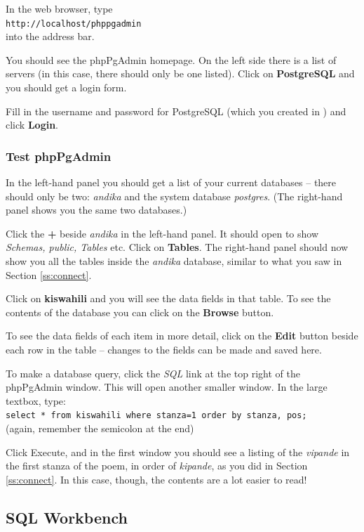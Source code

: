 In the web browser, type\\
\verb|http://localhost/phppgadmin|\\
into the address bar.

You should see the phpPgAdmin homepage. On the left side there is a list of servers (in this case, there should only be one listed). Click on \textbf{PostgreSQL} and you should get a login form.

Fill in the username and password for PostgreSQL (which you created in ) and click \textbf{Login}.

\subsubsection{Test phpPgAdmin}
\label{ss:testppa}

In the left-hand panel you should get a list of your current databases -- there should only be two: \textit{andika} and the system database \textit{postgres}. (The right-hand panel shows you the same two databases.)

Click the \textbf{+} beside \textit{andika} in the left-hand panel.  It should open to show \textit{Schemas, public, Tables} etc. Click on \textbf{Tables}. The right-hand panel should now show you all the tables inside the \textit{andika} database, similar to what you saw in Section \ref{ss:connect}.

Click on \textbf{kiswahili} and you will see the data fields in that table. To see the contents of the database you can click on the \textbf{Browse} button.

To see the data fields of each item in more detail, click on the \textbf{Edit} button beside each row in the table -- changes to the fields can be made and saved here.

To make a database query, click the \textit{SQL} link at the top right of the phpPgAdmin window.  This will open another smaller window.  In the large textbox, type:\\
\verb|select * from kiswahili where stanza=1 order by stanza, pos;|\\
(again, remember the semicolon at the end)

Click Execute, and in the first window you should see a listing of the \textit{vipande} in the first stanza of the poem, in order of \textit{kipande}, as you did in Section \ref{ss:connect}.  In this case, though, the contents are a lot easier to read!


\subsection{SQL Workbench}

